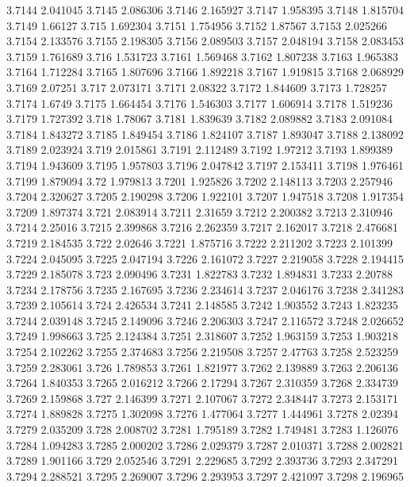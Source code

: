 3.7144  2.041045
3.7145  2.086306
3.7146  2.165927
3.7147  1.958395
3.7148  1.815704
3.7149  1.66127
3.715  1.692304
3.7151  1.754956
3.7152  1.87567
3.7153  2.025266
3.7154  2.133576
3.7155  2.198305
3.7156  2.089503
3.7157  2.048194
3.7158  2.083453
3.7159  1.761689
3.716  1.531723
3.7161  1.569468
3.7162  1.807238
3.7163  1.965383
3.7164  1.712284
3.7165  1.807696
3.7166  1.892218
3.7167  1.919815
3.7168  2.068929
3.7169  2.07251
3.717  2.073171
3.7171  2.08322
3.7172  1.844609
3.7173  1.728257
3.7174  1.6749
3.7175  1.664454
3.7176  1.546303
3.7177  1.606914
3.7178  1.519236
3.7179  1.727392
3.718  1.78067
3.7181  1.839639
3.7182  2.089882
3.7183  2.091084
3.7184  1.843272
3.7185  1.849454
3.7186  1.824107
3.7187  1.893047
3.7188  2.138092
3.7189  2.023924
3.719  2.015861
3.7191  2.112489
3.7192  1.97212
3.7193  1.899389
3.7194  1.943609
3.7195  1.957803
3.7196  2.047842
3.7197  2.153411
3.7198  1.976461
3.7199  1.879094
3.72  1.979813
3.7201  1.925826
3.7202  2.148113
3.7203  2.257946
3.7204  2.320627
3.7205  2.190298
3.7206  1.922101
3.7207  1.947518
3.7208  1.917354
3.7209  1.897374
3.721  2.083914
3.7211  2.31659
3.7212  2.200382
3.7213  2.310946
3.7214  2.25016
3.7215  2.399868
3.7216  2.262359
3.7217  2.162017
3.7218  2.476681
3.7219  2.184535
3.722  2.02646
3.7221  1.875716
3.7222  2.211202
3.7223  2.101399
3.7224  2.045095
3.7225  2.047194
3.7226  2.161072
3.7227  2.219058
3.7228  2.194415
3.7229  2.185078
3.723  2.090496
3.7231  1.822783
3.7232  1.894831
3.7233  2.20788
3.7234  2.178756
3.7235  2.167695
3.7236  2.234614
3.7237  2.046176
3.7238  2.341283
3.7239  2.105614
3.724  2.426534
3.7241  2.148585
3.7242  1.903552
3.7243  1.823235
3.7244  2.039148
3.7245  2.149096
3.7246  2.206303
3.7247  2.116572
3.7248  2.026652
3.7249  1.998663
3.725  2.124384
3.7251  2.318607
3.7252  1.963159
3.7253  1.903218
3.7254  2.102262
3.7255  2.374683
3.7256  2.219508
3.7257  2.47763
3.7258  2.523259
3.7259  2.283061
3.726  1.789853
3.7261  1.821977
3.7262  2.139889
3.7263  2.206136
3.7264  1.840353
3.7265  2.016212
3.7266  2.17294
3.7267  2.310359
3.7268  2.334739
3.7269  2.159868
3.727  2.146399
3.7271  2.107067
3.7272  2.348447
3.7273  2.153171
3.7274  1.889828
3.7275  1.302098
3.7276  1.477064
3.7277  1.444961
3.7278  2.02394
3.7279  2.035209
3.728  2.008702
3.7281  1.795189
3.7282  1.749481
3.7283  1.126076
3.7284  1.094283
3.7285  2.000202
3.7286  2.029379
3.7287  2.010371
3.7288  2.002821
3.7289  1.901166
3.729  2.052546
3.7291  2.229685
3.7292  2.393736
3.7293  2.347291
3.7294  2.288521
3.7295  2.269007
3.7296  2.293953
3.7297  2.421097
3.7298  2.196965
